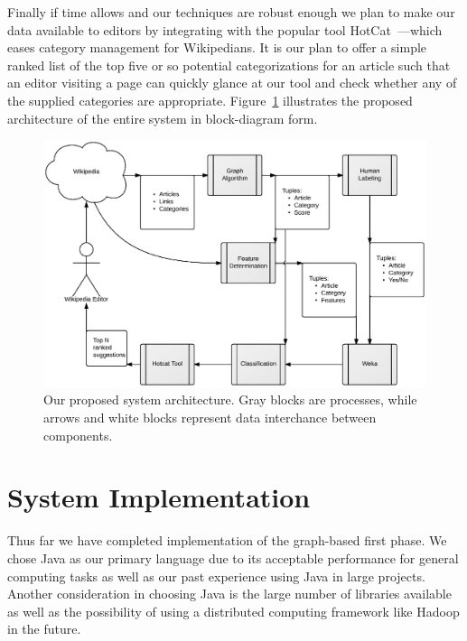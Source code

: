\documentclass[]{sig-alternate}
\begin{document}
Finally if time allows and our techniques are robust enough we plan to make our data available to editors by integrating with the popular tool HotCat~\cite{HotCat}---which eases category management for Wikipedians. It is our plan to offer a simple ranked list of the top five or so potential categorizations for an article such that an editor visiting a page can quickly glance at our tool and check whether any of the supplied categories are appropriate. Figure~\ref{fig:block_diagram} illustrates the proposed architecture of the entire system in block-diagram form.
\begin{figure}[htb!]
	\begin{center}
		\includegraphics[width=1.0\linewidth]{block_diagram}
	\end{center}
	\vspace{-12pt}
	\caption{Our proposed system architecture. Gray blocks are processes, while arrows and white blocks represent data interchance between components.}
	\label{fig:block_diagram}
\end{figure}

\section{System Implementation}
\label{sec:system_implementation}

Thus far we have completed implementation of the graph-based first phase. We chose Java as our primary language due to its acceptable performance for general computing tasks as well as our past experience using Java in large projects. Another consideration in choosing Java is the large number of libraries available as well as the possibility of using a distributed computing framework like Hadoop in the future.
\end{document}
